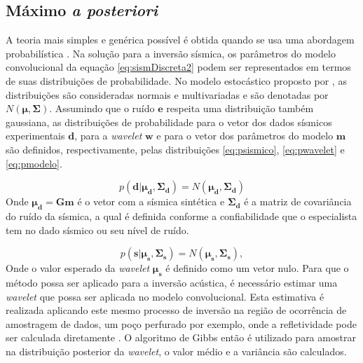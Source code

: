 \subsection{Máximo \textit{a posteriori}}
\label{sec:map}

A teoria mais simples e genérica possível é obtida quando se usa uma
abordagem probabilística \citep{tarantola}. Na solução para a inversão
sísmica, os parâmetros do modelo convolucional da equação \ref{eq:sismDiscreta2}
podem ser representados em termos de suas distribuições de probabilidade.
No modelo estocástico proposto por \cite{Figueiredo2014}, as distribuições
são consideradas normais e multivariadas e são denotadas por $N(\boldsymbol{\mu},\boldsymbol{\Sigma})$.
Assumindo que o ruído $\boldsymbol{e}$ respeita uma distribuição também gaussiana,
as distribuições de probabilidade para o vetor dos dados sísmicos experimentais
$\boldsymbol{d}$, para a \textit{wavelet} $\boldsymbol{w}$ e para
o vetor dos parâmetros do modelo $\boldsymbol{m}$ são
definidos, respectivamente, pelas distribuições \ref{eq:psismico}, \ref{eq:pwavelet} e \ref{eq:pmodelo}.

\begin{equation}
\label{eq:psismico}
p(\boldsymbol{d}|\boldsymbol{\mu_{d}},\boldsymbol{\Sigma_{d}}) =
N(\boldsymbol{\mu_{d}},\boldsymbol{\Sigma_{d}})
\end{equation}
Onde $\boldsymbol{\mu_{d}} = \boldsymbol{Gm}$ é o vetor com a sísmica
sintética e $\boldsymbol{\Sigma_{d}}$ é a matriz de covariância do ruído da
sísmica, a qual é definida conforme a confiabilidade que o especialista tem no
dado sísmico ou seu nível de ruído.

\begin{equation}
\label{eq:pwavelet}
p(\boldsymbol{s}|\boldsymbol{\mu_{s}},\boldsymbol{\Sigma_{s}}) =
N(\boldsymbol{\mu_{s}},\boldsymbol{\Sigma_{s}}),
\end{equation} 
Onde o valor esperado da \textit{wavelet} $\boldsymbol{\mu_{s}}$ é definido
como um vetor nulo. Para que o método possa ser aplicado para a inversão
acústica, é necessário estimar uma \textit{wavelet} que possa ser aplicada
no modelo convolucional. Esta estimativa é realizada aplicando este mesmo processo
de inversão na região de ocorrência de amostragem de dados, um poço perfurado por exemplo, onde a refletividade pode
ser calculada diretamente \citep{Figueiredo2014}. O algoritmo de
Gibbs então é utilizado para amostrar na distribuição posterior da \textit{wavelet}, 
o valor médio e a variância são calculados.

